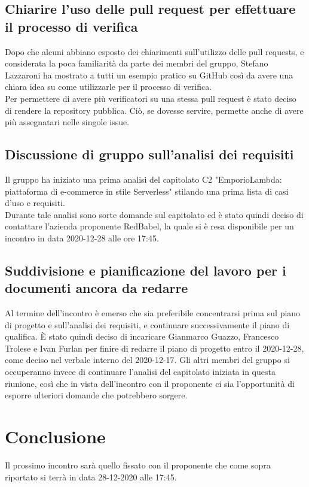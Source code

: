 \subsection{Chiarire l'uso delle pull request per effettuare il processo di verifica}
Dopo che alcuni abbiano esposto dei chiarimenti sull'utilizzo delle pull requests, e considerata la poca familiarità da parte dei membri del gruppo, Stefano Lazzaroni ha mostrato a tutti un esempio pratico su GitHub così da avere una chiara idea su come utilizzarle per il processo di verifica.\\
Per permettere di avere più verificatori su una stessa pull request è stato deciso di rendere la repository pubblica. Ciò, se dovesse servire, permette anche di avere più assegnatari nelle singole issue.

\subsection{Discussione di gruppo sull'analisi dei requisiti}
Il gruppo ha iniziato una prima analisi del capitolato C2 "EmporioLambda: piattaforma di e-commerce in stile Serverless" stilando una prima lista di casi d'uso e requisiti.\\
Durante tale analisi sono sorte domande sul capitolato ed è stato quindi deciso di contattare l'azienda proponente RedBabel, la quale si è resa disponibile per un incontro in data 2020-12-28 alle ore 17:45.

\subsection{Suddivisione e pianificazione del lavoro per i documenti ancora da redarre} 
Al termine dell'incontro è emerso che sia preferibile concentrarsi prima sul piano di progetto e sull'analisi dei requisiti, e continuare successivamente il piano di qualifica.
È stato quindi deciso di incaricare Gianmarco Guazzo, Francesco Trolese e Ivan Furlan per finire di redarre il piano di progetto entro il 2020-12-28, come deciso nel verbale interno del 2020-12-17. Gli altri membri del gruppo si occuperanno invece di continuare l'analisi del capitolato iniziata in questa riunione, così che in vista dell'incontro con il proponente ci sia l'opportunità di esporre ulteriori domande che potrebbero sorgere.

\section{Conclusione}
Il prossimo incontro sarà quello fissato con il proponente che come sopra riportato si terrà in data 28-12-2020 alle 17:45.

